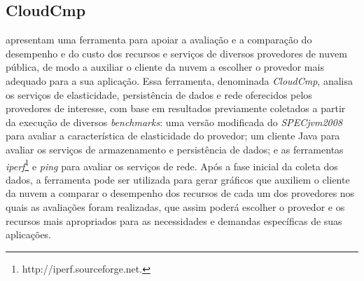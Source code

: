 

\subsection{CloudCmp}
 apresentam uma ferramenta para apoiar a avaliação e a comparação do
desempenho e do custo dos recursos e serviços de diversos provedores de nuvem
pública, de modo a auxiliar o cliente da nuvem a escolher o provedor mais adequado para a sua
aplicação. Essa ferramenta, denominada {\em CloudCmp}, analisa
os serviços de elasticidade, persistência de dados e rede oferecidos pelos provedores
de interesse, com base em resultados previamente coletados a partir da execução de diversos
{\em benchmarks}: uma versão modificada do {\em SPECjvm2008}~\cite{SPECjvm2008}
para avaliar a característica de elasticidade do provedor; um cliente Java para avaliar os serviços de
armazenamento e persistência de dados; e as ferramentas {\em iperf}\footnote{http://iperf.sourceforge.net. }
e {\em ping} para avaliar os serviços de rede. Após a fase inicial da coleta dos dados, a ferramenta pode ser utilizada para gerar gráficos que auxiliem o
cliente da nuvem a comparar o desempenho dos recursos de cada um
dos provedores nos quais as avaliações foram realizadas, que assim poderá escolher o provedor e os recursos mais apropriados para as necessidades e demandas específicas de suas aplicações. 


